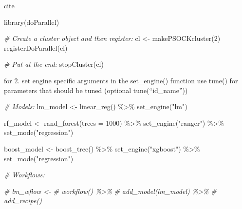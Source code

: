 \documentclass[
]{book}
\newenvironment{Shaded}{\begin{snugshade}}{\end{snugshade}}
\newcommand{\AttributeTok}[1]{\textcolor[rgb]{0.77,0.63,0.00}{#1}}
\newcommand{\CommentTok}[1]{\textcolor[rgb]{0.56,0.35,0.01}{\textit{#1}}}
\newcommand{\DecValTok}[1]{\textcolor[rgb]{0.00,0.00,0.81}{#1}}
\newcommand{\FunctionTok}[1]{\textcolor[rgb]{0.00,0.00,0.00}{#1}}
\newcommand{\NormalTok}[1]{#1}
\newcommand{\OtherTok}[1]{\textcolor[rgb]{0.56,0.35,0.01}{#1}}
\newcommand{\SpecialCharTok}[1]{\textcolor[rgb]{0.00,0.00,0.00}{#1}}
\newcommand{\StringTok}[1]{\textcolor[rgb]{0.31,0.60,0.02}{#1}}
\begin{document}
cite \citep{doParallel_package}

\begin{Shaded}
\begin{Highlighting}[]
\FunctionTok{library}\NormalTok{(doParallel)}

\CommentTok{\# Create a cluster object and then register: }
\NormalTok{cl }\OtherTok{\textless{}{-}} \FunctionTok{makePSOCKcluster}\NormalTok{(}\DecValTok{2}\NormalTok{)}
\FunctionTok{registerDoParallel}\NormalTok{(cl)}

\CommentTok{\# Put at the end:}
\FunctionTok{stopCluster}\NormalTok{(cl)}
\end{Highlighting}
\end{Shaded}

for 2. set engine specific arguments in the set\_engine() function use tune() for parameters that should be tuned (optional tune(``id\_name''))

\begin{Shaded}
\begin{Highlighting}[]
\CommentTok{\# Models:}
\NormalTok{lm\_model }\OtherTok{\textless{}{-}} \FunctionTok{linear\_reg}\NormalTok{() }\SpecialCharTok{\%\textgreater{}\%} 
  \FunctionTok{set\_engine}\NormalTok{(}\StringTok{"lm"}\NormalTok{)}

\NormalTok{rf\_model }\OtherTok{\textless{}{-}} \FunctionTok{rand\_forest}\NormalTok{(}\AttributeTok{trees =} \DecValTok{1000}\NormalTok{) }\SpecialCharTok{\%\textgreater{}\%} 
  \FunctionTok{set\_engine}\NormalTok{(}\StringTok{"ranger"}\NormalTok{) }\SpecialCharTok{\%\textgreater{}\%} 
  \FunctionTok{set\_mode}\NormalTok{(}\StringTok{"regression"}\NormalTok{)}

\NormalTok{boost\_model }\OtherTok{\textless{}{-}} \FunctionTok{boost\_tree}\NormalTok{() }\SpecialCharTok{\%\textgreater{}\%}
  \FunctionTok{set\_engine}\NormalTok{(}\StringTok{"xgboost"}\NormalTok{) }\SpecialCharTok{\%\textgreater{}\%} 
  \FunctionTok{set\_mode}\NormalTok{(}\StringTok{"regression"}\NormalTok{)}
\end{Highlighting}
\end{Shaded}

\begin{Shaded}
\begin{Highlighting}[]
\CommentTok{\# Workflows:}

\CommentTok{\# lm\_wflow \textless{}{-} }
\CommentTok{\#   workflow() \%\textgreater{}\% }
\CommentTok{\#   add\_model(lm\_model) \%\textgreater{}\% }
\CommentTok{\#   add\_recipe()}
\end{Highlighting}
\end{Shaded}
\end{document}
